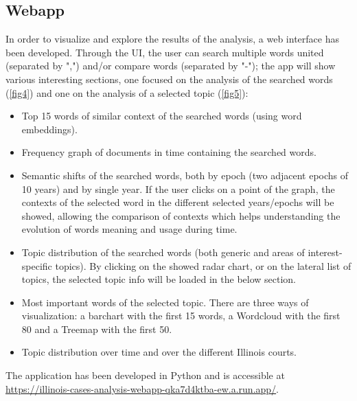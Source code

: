 \subsection{Webapp}
In order to visualize and explore the results of the analysis, a web interface has been developed. Through the UI, the
user can search multiple words united (separated by ",") and/or compare words (separated by "-"); the app will show
various interesting sections, one focused on the analysis of the searched words (\vref{fig4}) and one on the
analysis of a selected topic (\vref{fig5}):
\begin{itemize}
  \item Top 15 words of similar context of the searched words (using word embeddings).
  \item Frequency graph of documents in time containing the searched words.
  \item Semantic shifts of the searched words, both by epoch (two adjacent epochs of 10 years) and by single year.
    If the user clicks on a point of the graph, the contexts of the selected word in the different selected years/epochs
    will be showed, allowing the comparison of contexts which helps understanding the evolution of words meaning and usage
    during time.
  \item Topic distribution of the searched words (both generic and areas of interest-specific topics). By clicking on the
    showed radar chart, or on the lateral list of topics, the selected topic info will be loaded in the below section.
  \item Most important words of the selected topic. There are three ways of visualization: a barchart with the first 15
    words, a Wordcloud with the first 80 and a Treemap with the first 50.
  \item Topic distribution over time and over the different Illinois courts.
\end{itemize}
The application has been developed in Python and is accessible at
\url{https://illinois-cases-analysis-webapp-qka7d4ktba-ew.a.run.app/}.
